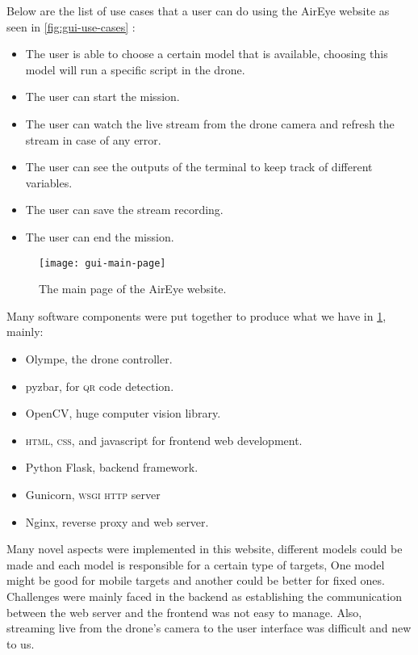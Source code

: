 \documentclass[../main.tex]{subfiles}
\begin{document}
Below are the list of use cases that a user can do using the AirEye website as seen in \cref{fig:gui-use-cases} : 
\begin{itemize}	
	\item The user is able to choose a certain model that is available, choosing this model will run a specific script in the drone. 
	\item The user can start the mission.
	\item The user can watch the live stream from the drone camera and refresh the stream in case of any error.
	\item The user can see the outputs of the terminal to keep track of different variables.
	\item The user can save the stream recording. 
	\item The user can end the mission.
\end{itemize}

\begin{figure}[tbp]
	\centering
	\texttt{[image: gui-main-page]}
	\caption{The main page of the AirEye website.}
	\label{fig:gui-main-page}
\end{figure}

Many software components were put together to produce what we have in \cref{fig:gui-main-page}, mainly: 
\begin{itemize}
	\item Olympe, the drone controller. 
	\item pyzbar, for \textsc{qr} code detection.
	\item OpenCV, huge computer vision library.
	\item \textsc{html}, \textsc{css}, and javascript for frontend web 
	development.
	\item Python Flask, backend framework.
	\item Gunicorn, \textsc{wsgi} \textsc{http} server
	\item Nginx, reverse proxy and web server. 
\end{itemize}

Many novel aspects were implemented in this website, different models could be 
made and each model is responsible for a certain type of targets, One model 
might be good for mobile targets and another could be better for fixed ones. 
Challenges were mainly faced in the backend as establishing the communication 
between the web server and the frontend was not easy to manage. Also, 
streaming live from the drone's camera to the user interface was 
difficult and new to us.
\end{document}
